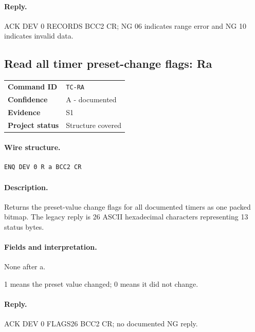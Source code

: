 \documentclass[10pt,letterpaper]{article}
\begin{document}
\paragraph{Reply.} ACK DEV 0 RECORDS BCC2 CR; NG 06 indicates range error and NG 10 indicates invalid data.

\subsection{Read all timer preset-change flags: Ra}
\begin{tabularx}{\textwidth}{@{}>{\bfseries}p{2.8cm}X@{}}
Command ID & \texttt{TC-RA} \\
Confidence & A - documented \\
Evidence & S1 \\
Project status & Structure covered \\
\end{tabularx}
\vspace{0.35em}
\paragraph{Wire structure.}
\begin{Verbatim}[breaklines=true,breakanywhere=true,fontsize=\small]
ENQ DEV 0 R a BCC2 CR
\end{Verbatim}
\paragraph{Description.} Returns the preset-value change flags for all documented timers as one packed bitmap. The legacy reply is 26 ASCII hexadecimal characters representing 13 status bytes.
\paragraph{Fields and interpretation.}
\begin{description}[style=nextline,leftmargin=3.2cm,labelwidth=3.0cm,font=\normalfont\bfseries]
\item[Request payload] None after a.
\item[Bit meaning] 1 means the preset value changed; 0 means it did not change.
\end{description}
\paragraph{Reply.} ACK DEV 0 FLAGS26 BCC2 CR; no documented NG reply.
\end{document}
